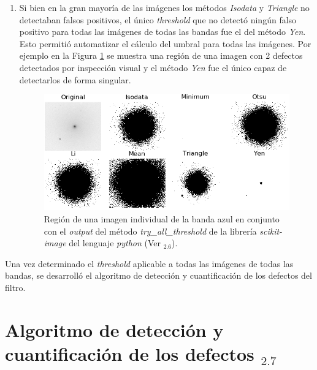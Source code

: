 \begin{enumerate}
\item Si bien en la gran mayoría de las imágenes los métodos \textit{Isodata}\cite{ridler} y \textit{Triangle}\cite{triang} no detectaban falsos positivos, el único \textit{threshold} que no detectó ningún falso positivo para todas las imágenes de todas las bandas fue el del método \textit{Yen}. Esto permitió automatizar el cálculo del umbral para todas las imágenes. Por ejemplo en la Figura \ref{fig:threshcom2} se muestra una región de una imagen con 2 defectos detectados por inspección visual y el método \textit{Yen} fue el único capaz de detectarlos de forma singular.

\begin{figure}[H]
	\centering
	\includegraphics[width=1.0\textwidth]{Figs/defectosZEISS/thresh_vivos_compar3.png}
	\caption{Región de una imagen individual de la banda azul en conjunto con el \textit{output} del método \textit{try\_all\_threshold} de la librería \textit{scikit-image} del lenguaje \textit{python} (Ver \href{https://github.com/jrr1984/defects_analysis/blob/master/try_all_thresholds.py}{\faGithub$_{2.6}$}).} 
	\label{fig:threshcom2}
\end{figure}
\end{enumerate}


\hspace{0.5cm}Una vez determinado el \textit{threshold} aplicable a todas las imágenes de todas las bandas, se desarrolló el algoritmo de detección y cuantificación de los defectos del filtro.

\singlespacing
\section{Algoritmo de detección y cuantificación de los defectos \href{https://github.com/jrr1984/defects_analysis/blob/master/defects_thresholding.py}{\faGithub$_{2.7}$}}
\label{sec:secalg}

